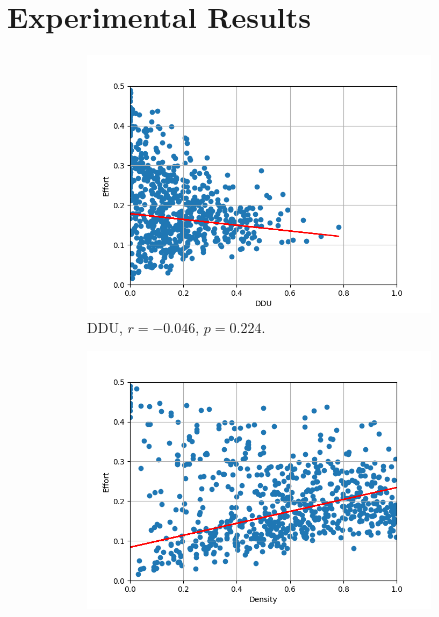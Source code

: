 \documentclass[twoside,a4paper,11pt]{memoir}
\begin{document}
\section{Experimental Results}
\label{sec:rq2_experimental_results}

\begin{figure}
    \centering
    \begin{subfigure}[b]{0.49\linewidth}
        \centering
        \includegraphics[width=\linewidth]{figures/ddu_effort_goodness_025}
        \caption{DDU, $r = -0.046$, $p = 0.224$.}
        \label{fig:ddu_effort_goodness_025}
    \end{subfigure}
    \hfill
    \begin{subfigure}[b]{0.49\linewidth}
        \centering
        \includegraphics[width=\linewidth]{figures/density_effort_goodness_025}

\end{subfigure}
\end{figure}
\end{document}
